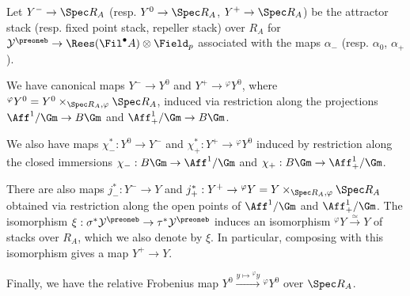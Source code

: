 \documentclass[10pt]{amsart}
\begin{document}
\begin{definition}
\label{defn:fp_stacks_from_fzip}
Let $Y^-\to \Spec R_A$ (resp. $Y^0\to \Spec R_A$, $Y^+\to \Spec R_A$) be the attractor stack (resp. fixed point stack, repeller stack) over $R_A$ for $\mathcal{Y}^\preoneb\to \Rees(\Fil^\bullet A)\otimes\Field_p$ associated with the maps $\alpha_-$ (resp. $\alpha_0$, $\alpha_+$). 
\end{definition}

\begin{remark}
We have canonical maps $Y^-\to Y^0$ and $Y^+\to {}^\varphi Y^0$, where ${}^\varphi Y^0 = Y^0\times_{\Spec R_A,\varphi}\Spec R_A$, induced via restriction along the projections $\Aff^1/\Gm\to B\Gm$ and $\Aff^1_+/\Gm\to B\Gm$. 

We also have maps $\chi^*_-:Y^0\to Y^-$ and $\chi^*_+:Y^+\to {}^{\varphi}Y^0$ induced by restriction along the closed immersions $\chi_-:B\Gm\to \Aff^1/\Gm$ and $\chi_+:B\Gm\to \Aff^1_+/\Gm$. 

There are also maps $j_-^*:Y^-\to Y$ and $j_+^*:Y^+\to {}^\varphi Y = Y\times_{\Spec R_A,\varphi}\Spec R_A$ obtained via restriction along the open points of $\Aff^1/\Gm$ and $\Aff^1_+/\Gm$. The isomorphism $\xi:\sigma^*\mathcal{Y}^\preoneb \to \tau^* \mathcal{Y}^\preoneb$ induces an isomorphism ${}^\varphi Y \xrightarrow{\simeq}Y$ of stacks over $R_A$, which we also denote by $\xi$. In particular, composing with this isomorphism gives a map $Y^+\to Y$.

Finally, we have the relative Frobenius map $Y^0\xrightarrow{y\mapsto {}^\varphi y} {}^{\varphi}Y^0$ over $\Spec R_A$.
\end{remark}
\end{document}
